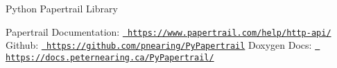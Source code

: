 Python Papertrail Library

Papertrail Documentation\+: \href{https://www.papertrail.com/help/http-api/}{\texttt{ https\+://www.\+papertrail.\+com/help/http-\/api/}} Github\+: \href{https://github.com/pnearing/PyPapertrail}{\texttt{ https\+://github.\+com/pnearing/\+Py\+Papertrail}} Doxygen Docs\+: \href{https://docs.peternearing.ca/PyPapertrail/}{\texttt{ https\+://docs.\+peternearing.\+ca/\+Py\+Papertrail/}} 